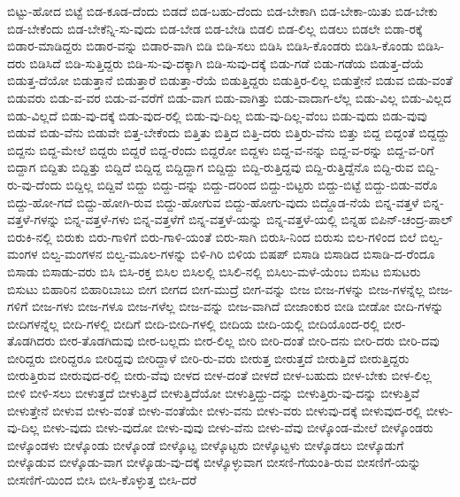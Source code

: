 {ಬಿಟ್ಟು-ಹೋದ
ಬಿಟ್ಟೆ
ಬಿಡ-ಕೂಡ-ದೆಂದು
ಬಿಡದೆ
ಬಿಡ-ಬಹು-ದೆಂದು
ಬಿಡ-ಬೇಕಾಗಿ
ಬಿಡ-ಬೇಕಾ-ಯಿತು
ಬಿಡ-ಬೇಕು
ಬಿಡ-ಬೇಕೆಂದು
ಬಿಡ-ಬೇಕೆನ್ನಿ-ಸು-ವುದು
ಬಿಡ-ಬೇಡ
ಬಿಡ-ಬೇಡಿ
ಬಿಡಲಿ
ಬಿಡ-ಲಿಲ್ಲ
ಬಿಡಲು
ಬಿಡಲೇ
ಬಿಡಾ-ರಕ್ಕೆ
ಬಿಡಾರ-ಮಾಡಿದ್ದರು
ಬಿಡಾರ-ವನ್ನು
ಬಿಡಾರ-ವಾಗಿ
ಬಿಡಿ
ಬಿಡಿ-ಸಲು
ಬಿಡಿಸಿ
ಬಿಡಿಸಿ-ಕೊಂಡರು
ಬಿಡಿಸಿ-ಕೊಂಡು
ಬಿಡಿಸಿ-ದರು
ಬಿಡಿಸಿದೆ
ಬಿಡಿ-ಸುತ್ತಿದ್ದರು
ಬಿಡಿ-ಸು-ವು-ದಕ್ಕಾಗಿ
ಬಿಡಿ-ಸುವು-ದಕ್ಕೆ
ಬಿಡು-ಗಡೆ
ಬಿಡು-ಗಡೆಯ
ಬಿಡುತ್ತ-ದೆಯೆ
ಬಿಡುತ್ತ-ದೆಯೋ
ಬಿಡುತ್ತಾನೆ
ಬಿಡುತ್ತಾರೆ
ಬಿಡುತ್ತಾ-ರೆಯೆ
ಬಿಡುತ್ತಿದ್ದರು
ಬಿಡುತ್ತಿರ-ಲಿಲ್ಲ
ಬಿಡುತ್ತೇನೆ
ಬಿಡುವ
ಬಿಡು-ವಂತೆ
ಬಿಡುವರು
ಬಿಡು-ವ-ವರ
ಬಿಡು-ವ-ವರೆಗೆ
ಬಿಡು-ವಾಗ
ಬಿಡು-ವಾಗಿತ್ತು
ಬಿಡು-ವಾದಾಗ-ಲೆಲ್ಲ
ಬಿಡು-ವಿಲ್ಲ
ಬಿಡು-ವಿಲ್ಲದ
ಬಿಡು-ವಿಲ್ಲದೆ
ಬಿಡು-ವು-ದಕ್ಕೆ
ಬಿಡು-ವುದ-ರಲ್ಲಿ
ಬಿಡು-ವು-ದಿಲ್ಲ
ಬಿಡು-ವು-ದಿಲ್ಲ-ವೆಂಬ
ಬಿಡು-ವುದು
ಬಿಡು-ವುವು
ಬಿಡುವೆ
ಬಿಡು-ವೆನು
ಬಿಡುವೇ
ಬಿತ್ತ-ಬೇಕೆಂದು
ಬಿತ್ತಿತು
ಬಿತ್ತಿದ
ಬಿತ್ತಿ-ದರು
ಬಿತ್ತಿರು-ವೆನು
ಬಿತ್ತು
ಬಿದ್ದ
ಬಿದ್ದಂತೆ
ಬಿದ್ದದ್ದು
ಬಿದ್ದನು
ಬಿದ್ದ-ಮೇಲೆ
ಬಿದ್ದರು
ಬಿದ್ದರೆ
ಬಿದ್ದ-ರೆಂದು
ಬಿದ್ದರೋ
ಬಿದ್ದಳು
ಬಿದ್ದ-ವ-ನನ್ನು
ಬಿದ್ದ-ವ-ರನ್ನು
ಬಿದ್ದ-ವ-ರಿಗೆ
ಬಿದ್ದಾಗ
ಬಿದ್ದಿತು
ಬಿದ್ದಿತ್ತು
ಬಿದ್ದಿದೆ
ಬಿದ್ದಿದ್ದ
ಬಿದ್ದಿದ್ದಾಗ
ಬಿದ್ದಿದ್ದು
ಬಿದ್ದಿ-ರುತ್ತಿದ್ದವು
ಬಿದ್ದಿ-ರುತ್ತಿದ್ದೆನೊ
ಬಿದ್ದಿ-ರುವ
ಬಿದ್ದಿ-ರು-ವು-ದೆಂದು
ಬಿದ್ದಿಲ್ಲ
ಬಿದ್ದಿವೆ
ಬಿದ್ದು
ಬಿದ್ದು-ದನ್ನು
ಬಿದ್ದು-ದರಿಂದ
ಬಿದ್ದು-ಬಿಟ್ಟರು
ಬಿದ್ದು-ಬಿಟ್ಟೆ
ಬಿದ್ದು-ಬಿಡು-ವರೊ
ಬಿದ್ದು-ಹೋ-ಗದೆ
ಬಿದ್ದು-ಹೋಗಿ-ರುವ
ಬಿದ್ದು-ಹೋಗುವ
ಬಿದ್ದು-ಹೋಗು-ವುದು
ಬಿದ್ದೊಡ-ನೆಯೆ
ಬಿನ್ನ-ವತ್ತಳೆ
ಬಿನ್ನ-ವತ್ತಳೆ-ಗಳನ್ನು
ಬಿನ್ನ-ವತ್ತಳೆ-ಗಳು
ಬಿನ್ನ-ವತ್ತಳೆಗೆ
ಬಿನ್ನ-ವತ್ತಳೆ-ಯನ್ನು
ಬಿನ್ನ-ವತ್ತಳೆ-ಯಲ್ಲಿ
ಬಿನ್ನಹ
ಬಿಪಿನ್-ಚಂದ್ರ-ಪಾಲ್
ಬಿರುಕಿ-ನಲ್ಲಿ
ಬಿರುಕು
ಬಿರು-ಗಾಳಿಗೆ
ಬಿರು-ಗಾಳಿ-ಯಂತೆ
ಬಿರು-ಸಾಗಿ
ಬಿರುಸಿ-ನಿಂದ
ಬಿರುಸು
ಬಿಲ-ಗಳಿಂದ
ಬಿಲೆ
ಬಿಲ್ವ-ಮಂಗಳ
ಬಿಲ್ವ-ಮಂಗಳನ
ಬಿಲ್ವ-ಮೂಲ-ಗಳನ್ನು
ಬಿಳಿ-ಗಿರಿ
ಬಿಳಿಯ
ಬಿಷಪ್
ಬಿಸಾಡಿ
ಬಿಸಾಡಿದ
ಬಿಸಾಡಿ-ದ-ರೆಂದೂ
ಬಿಸಾಡು
ಬಿಸಾಡು-ವರು
ಬಿಸಿ
ಬಿಸಿ-ರಕ್ತ
ಬಿಸಿಲ
ಬಿಸಿಲಲ್ಲಿ
ಬಿಸಿಲಿ-ನಲ್ಲಿ
ಬಿಸಿಲು-ಮಳೆ-ಯೆಂಬ
ಬಿಸುಟ
ಬಿಸುಟರು
ಬಿಸುಟು
ಬಿಹಾರಿನ
ಬಿಹಾರಿಬಾಬು
ಬೀಗ
ಬೀಗದ
ಬೀಗ-ಮುದ್ರೆ
ಬೀಗ-ವನ್ನು
ಬೀಜ
ಬೀಜ-ಗಳನ್ನು
ಬೀಜ-ಗಳನ್ನೆಲ್ಲ
ಬೀಜ-ಗಳಿಗೆ
ಬೀಜ-ಗಳು
ಬೀಜ-ಗಳೂ
ಬೀಜ-ಗಳೆಲ್ಲ
ಬೀಜ-ವನ್ನು
ಬೀಜ-ವಾಗಿದೆ
ಬೀಜಾಂಕುರ
ಬೀಡಿ
ಬೀಡೋ
ಬೀದಿ-ಗಳನ್ನು
ಬೀದಿಗಳನ್ನೆಲ್ಲ
ಬೀದಿ-ಗಳಲ್ಲಿ
ಬೀದಿಗೆ
ಬೀದಿ-ಬೀದಿ-ಗಳಲ್ಲಿ
ಬೀದಿಯ
ಬೀದಿ-ಯಲ್ಲಿ
ಬೀದಿಯೊಂದ-ರಲ್ಲಿ
ಬೀರ-ತೊಡಗಿದರು
ಬೀರ-ತೊಡಗಿದುವು
ಬೀರ-ಬಲ್ಲದು
ಬೀರ-ಲಿಲ್ಲ
ಬೀರಿ
ಬೀರಿ-ದಂತೆ
ಬೀರಿ-ದನು
ಬೀರಿ-ದರು
ಬೀರಿ-ದವು
ಬೀರಿದ್ದರು
ಬೀರಿದ್ದರೂ
ಬೀರಿದ್ದವು
ಬೀರಿದ್ದಾಳೆ
ಬೀರಿ-ರು-ವರು
ಬೀರುತ್ತ
ಬೀರುತ್ತದೆ
ಬೀರುತ್ತಿದೆ
ಬೀರುತ್ತಿದ್ದರು
ಬೀರುತ್ತಿರುವ
ಬೀರುವುದ-ರಲ್ಲಿ
ಬೀರು-ವೆವು
ಬೀಳದ
ಬೀಳ-ದಂತೆ
ಬೀಳದೆ
ಬೀಳ-ಬಹುದು
ಬೀಳ-ಬೇಕು
ಬೀಳ-ಲಿಲ್ಲ
ಬೀಳಿ
ಬೀಳಿ-ಸಲು
ಬೀಳುತ್ತದೆ
ಬೀಳುತ್ತಿದೆ
ಬೀಳುತ್ತಿದೆಯೋ
ಬೀಳುತ್ತಿದ್ದು-ದನ್ನು
ಬೀಳುತ್ತಿರು-ವು-ದನ್ನು
ಬೀಳುತ್ತಿವೆ
ಬೀಳುತ್ತೇನೆ
ಬೀಳುವ
ಬೀಳು-ವಂತೆ
ಬೀಳು-ವಂತೆಯೇ
ಬೀಳು-ವನು
ಬೀಳು-ವರು
ಬೀಳುವು-ದಕ್ಕೆ
ಬೀಳುವುದ-ರಲ್ಲಿ
ಬೀಳು-ವು-ದಿಲ್ಲ
ಬೀಳು-ವುದು
ಬೀಳು-ವುದೋ
ಬೀಳು-ವುವು
ಬೀಳು-ವೆನು
ಬೀಳು-ವೆವು
ಬೀಳ್ಕೊಂಡ-ಮೇಲೆ
ಬೀಳ್ಕೊಂಡರು
ಬೀಳ್ಕೊಂಡಳು
ಬೀಳ್ಕೊಂಡು
ಬೀಳ್ಕೊಂಡೆ
ಬೀಳ್ಕೊಟ್ಟ
ಬೀಳ್ಕೊಟ್ಟರು
ಬೀಳ್ಕೊಟ್ಟಳು
ಬೀಳ್ಕೊಡಲು
ಬೀಳ್ಕೊಡುಗೆ
ಬೀಳ್ಕೊಡುವ
ಬೀಳ್ಕೊಡು-ವಾಗ
ಬೀಳ್ಕೊಡು-ವು-ದಕ್ಕೆ
ಬೀಳ್ಕೊಳ್ಳುವಾಗ
ಬೀಸಣಿ-ಗೆಯಂತಿ-ರುವ
ಬೀಸಣಿಗೆ-ಯನ್ನು
ಬೀಸಣಿಗೆ-ಯಿಂದ
ಬೀಸಿ
ಬೀಸಿ-ಕೊಳ್ಳುತ್ತ
ಬೀಸಿ-ದರೆ
}
